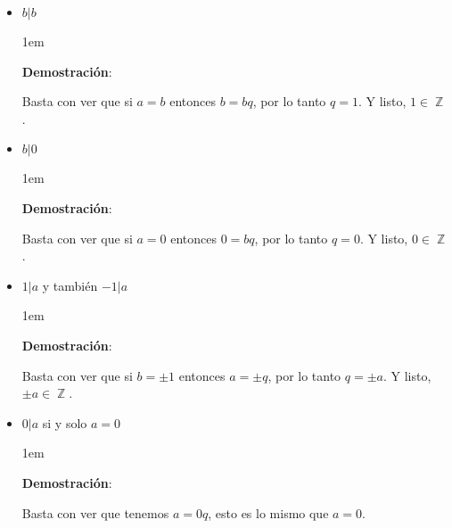 \documentclass[12pt]{report}                                    %
\newenvironment{SmallIndentation}[1][0.75em]                    %
    {\begin{adjustwidth}{#1}{}\begin{footnotesize}}                 %
    {\end{footnotesize}\end{adjustwidth}}                           %
\DeclareMathOperator \Integers  {\mathbb{Z}}                     %
\begin{document}
            \begin{itemize}

                \item $b|b$

                    \begin{SmallIndentation}[1em]
                        \textbf{Demostración}:

                        Basta con ver que si $a = b$ entonces $b = bq$, por lo tanto $q = 1$.
                        Y listo, $1 \in \Integers$.

                    \end{SmallIndentation}

                \item $b|0$

                    \begin{SmallIndentation}[1em]
                        \textbf{Demostración}:

                        Basta con ver que si $a = 0$ entonces $0 = bq$, por lo tanto $q = 0$.
                        Y listo, $0 \in \Integers$.

                    \end{SmallIndentation}

                \item $1|a$ y también $-1|a$

                    \begin{SmallIndentation}[1em]
                        \textbf{Demostración}:

                        Basta con ver que si $b = \pm 1$ entonces $a = \pm q$, por lo tanto $q = \pm a$.
                        Y listo, $\pm a \in \Integers$.

                    \end{SmallIndentation}
            
                \item $0|a$ si y solo $a=0$

                    \begin{SmallIndentation}[1em]
                        \textbf{Demostración}:

                        Basta con ver que tenemos $a = 0q$, esto es lo mismo que $a = 0$.

                    \end{SmallIndentation}


\end{itemize}
\end{document}
